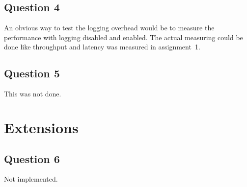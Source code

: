 \documentclass[a4paper]{article}
\begin{document}
\subsection{Question 4}

An obvious way to test the logging overhead would be to measure the performance
with logging disabled and enabled. The actual measuring could be done like
throughput and latency was measured in assignment~1.

\subsection{Question 5}

This was not done.

\section{Extensions}

\subsection{Question 6}

Not implemented.
\end{document}
